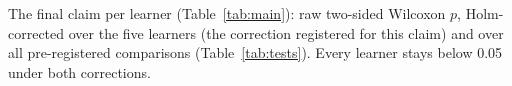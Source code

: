 \documentclass{article}
\begin{document}
\begin{table}[h]
\caption{The final claim per learner (Table~\ref{tab:main}): raw two-sided Wilcoxon $p$, Holm-corrected over the five
learners (the correction registered for this claim) and over all \nTests{} pre-registered comparisons (Table~\ref{tab:tests}). Every learner stays below 0.05 under both
corrections.}
\label{tab:final_p}
\centering
\small

\end{table}
\end{document}
